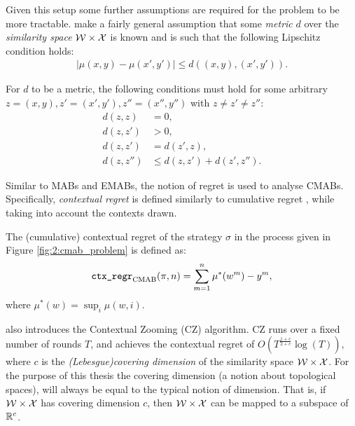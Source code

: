         Given this setup some further assumptions are required for the problem to be more tractable. \citet{cz_long} make a fairly general assumption that some \textit{metric} $d$ over the \textit{similarity space} $\mathcal{W}\times\mathcal{X}$ is known and is such that the following Lipschitz condition holds:
        \begin{align}
            |\mu(x,y) - \mu(x',y')| \leq d((x,y),(x',y')). \label{eq:2:zooming_lipschitz_condition}
        \end{align} 

        For $d$ to be a metric, the following conditions must hold for some arbitrary $z=(x,y), z'=(x',y'), z''=(x'',y'')$ with $z\neq z'\neq z''$:
        \begin{align}
            d(z,z) &= 0, \label{eq:2:metric_def_1} \\
            d(z,z') &> 0, \label{eq:2:metric_def_2} \\
            d(z,z') &= d(z',z), \label{eq:2:metric_def_3} \\
            d(z,z'') &\leq d(z,z') + d(z',z''). \label{eq:2:metric_def_4} 
        \end{align}

        Similar to MABs and EMABs, the notion of regret is used to analyse CMABs. Specifically, \textit{contextual regret} is defined similarly to cumulative regret \cite{cz,cz_long}, while taking into account the contexts drawn.
        \begin{defn}
            \label{def:2:contextual_regret}
            The \textnormal{(cumulative) contextual regret} of the strategy $\sigma$ in the process given in Figure \ref{fig:2:cmab_problem} is defined as:
            \begin{align}
                {\textnormal{\texttt{ctx\_regr}}}_{{\textnormal{CMAB}}}(\pi,n) = \sum_{m=1}^n \mu^*(w^m) - y^m, \label{eq:2:contextual_regret_def}
            \end{align}
            where $\mu^*(w) = \sup_i \mu(w,i)$.
        \end{defn}
        
        \citet{cz_long} also introduces the Contextual Zooming (CZ) algorithm. CZ runs over a fixed number of rounds $T$, and achieves the contextual regret of $O(T^{\frac{1+c}{2+c}}\log(T))$, where $c$ is the \textit{(Lebesgue)covering dimension} of the similarity space $\mathcal{W}\times\mathcal{X}$. For the purpose of this thesis the covering dimension (a notion about topological spaces), will always be equal to the typical notion of dimension. That is, if $\mathcal{W}\times\mathcal{X}$ has covering dimension $c$, then $\mathcal{W}\times\mathcal{X}$ can be mapped to a subspace of $\mathbb{R}^{c}$.

